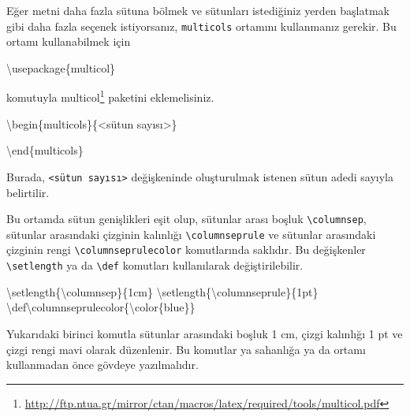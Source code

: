 \documentclass[
  10pt,
]{scrbook}
\newenvironment{Shaded}{\begin{snugshade}}{\end{snugshade}}
\newcommand{\NormalTok}[1]{#1}
\newcommand{\SpecialCharTok}[1]{\textcolor[rgb]{0.00,0.00,0.00}{#1}}
\renewcommand{\href}[2]{#2\footnote{\url{#1}}}
\begin{document}
Eğer metni daha fazla sütuna bölmek ve sütunları istediğiniz yerden
başlatmak gibi daha fazla seçenek istiyorsanız, \texttt{multicols} ortamını
kullanmanız gerekir. Bu ortamı kullanabilmek için

\begin{Shaded}
\begin{Highlighting}[]
\NormalTok{\textbackslash{}usepackage\{multicol\}}
\end{Highlighting}
\end{Shaded}

komutuyla
\href{http://ftp.ntua.gr/mirror/ctan/macros/latex/required/tools/multicol.pdf}{multicol} paketini eklemelisiniz.

\begin{Shaded}
\begin{Highlighting}[]
\NormalTok{\textbackslash{}begin\{multicols\}\{}\SpecialCharTok{\textless{}}\NormalTok{sütun sayısı}\SpecialCharTok{\textgreater{}}\NormalTok{\}}

\NormalTok{\textbackslash{}end\{multicols\}}
\end{Highlighting}
\end{Shaded}

Burada, \texttt{\textless{}sütun\ sayısı\textgreater{}} değişkeninde oluşturulmak istenen sütun adedi
sayıyla belirtilir.

Bu ortamda sütun genişlikleri eşit olup, sütunlar arası boşluk
\texttt{\textbackslash{}columnsep}, sütunlar arasındaki çizginin kalınlığı \texttt{\textbackslash{}columnseprule} ve
sütunlar arasındaki çizginin rengi \texttt{\textbackslash{}columnseprulecolor} komutlarında
saklıdır. Bu değişkenler \texttt{\textbackslash{}setlength} ya da \texttt{\textbackslash{}def} komutları
kullanılarak değiştirilebilir.

\begin{Shaded}
\begin{Highlighting}[numbers=left,,]
\NormalTok{\textbackslash{}setlength\{\textbackslash{}columnsep\}\{1cm\}}
\NormalTok{\textbackslash{}setlength\{\textbackslash{}columnseprule\}\{1pt\}}
\NormalTok{\textbackslash{}def\textbackslash{}columnseprulecolor\{\textbackslash{}color\{blue\}\}}
\end{Highlighting}
\end{Shaded}

Yukarıdaki birinci komutla sütunlar arasındaki boşluk 1 cm, çizgi
kalınlığı 1 pt ve çizgi rengi mavi olarak düzenlenir. Bu komutlar ya
sahanlığa ya da ortamı kullanmadan önce gövdeye yazılmalıdır.
\end{document}
